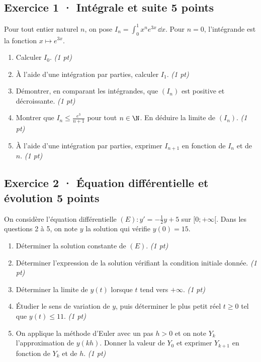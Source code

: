 \subsection*{Exercice 1 · Intégrale et suite \hfill 5 points}Pour tout entier naturel $n$, on pose $I_n=\displaystyle\int_0^1x^ne^{3x}\,\dd x$. Pour $n=0$, l'intégrande est la fonction $x\mapsto e^{3x}$.

\begin{enumerate}

\item Calculer $I_0$. \hfill\textit{(1 pt)}

\item À l'aide d'une intégration par parties, calculer $I_1$. \hfill\textit{(1 pt)}

\item Démontrer, en comparant les intégrandes, que $(I_n)$ est positive et décroissante. \hfill\textit{(1 pt)}

\item Montrer que $I_n\le\frac{e^{3}}{n+1}$ pour tout $n\in\N$. En déduire la limite de $(I_n)$. \hfill\textit{(1 pt)}

\item À l'aide d'une intégration par parties, exprimer $I_{n+1}$ en fonction de $I_n$ et de $n$. \hfill\textit{(1 pt)}

\end{enumerate}

\subsection*{Exercice 2 · Équation différentielle et évolution \hfill 5 points}On considère l'équation différentielle $(E):y'=-\frac1{2}y+5$ sur $[0;+\infty[$. Dans les questions 2 à 5, on note $y$ la solution qui vérifie $y(0)=15$.

\begin{enumerate}

\item Déterminer la solution constante de $(E)$. \hfill\textit{(1 pt)}

\item Déterminer l'expression de la solution vérifiant la condition initiale donnée. \hfill\textit{(1 pt)}

\item Déterminer la limite de $y(t)$ lorsque $t$ tend vers $+\infty$. \hfill\textit{(1 pt)}

\item Étudier le sens de variation de $y$, puis déterminer le plus petit réel $t\ge0$ tel que $y(t)\le11$. \hfill\textit{(1 pt)}

\item On applique la méthode d'Euler avec un pas $h>0$ et on note $Y_k$ l'approximation de $y(kh)$. Donner la valeur de $Y_0$ et exprimer $Y_{k+1}$ en fonction de $Y_k$ et de $h$. \hfill\textit{(1 pt)}

\end{enumerate}

